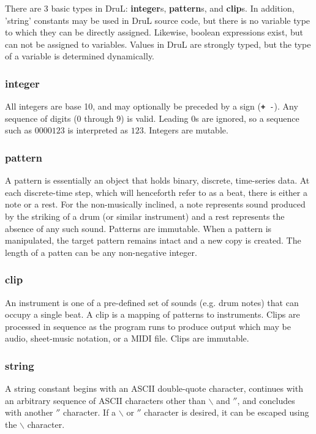 \documentclass[11pt,twoside]{article}
\begin{document}
There are $3$ basic types in DruL: \textbf{integer}s, \textbf{pattern}s,
and \textbf{clip}s.  In addition, 'string' constants may be used in DruL source code, but there is no variable type to which they can be directly assigned.
Likewise, boolean expressions exist, but can not be assigned to variables.
Values in DruL are strongly typed, but the type of a variable is determined dynamically.

\subsubsection{integer}
All integers are base 10, and may optionally be preceded by a sign ({\tt \textbf + -}).
Any sequence of digits ($0$ through $9$) is valid.  Leading $0$s are ignored, so a sequence such as $0000123$  is interpreted as $123$.  Integers are mutable.

\subsubsection{pattern}
A pattern is essentially an object that holds binary, discrete, time-series data.  At each discrete-time step, which will henceforth refer to as a beat, there is either a note or a rest.  For the non-musically inclined, a note represents sound produced by the striking of a drum (or similar instrument) and a rest represents the absence of any such sound.  Patterns are immutable.  When a pattern is manipulated, the target pattern remains intact and a new copy is created.  The length of a patten can be any non-negative integer.

\subsubsection{clip}

An instrument is one of a pre-defined set of sounds (e.g. drum notes) that can occupy a single beat.
A clip is a mapping of patterns to instruments. Clips are processed in sequence as the program runs to produce output which may be audio, sheet-music notation, or a MIDI file.  Clips are immutable.

\subsubsection{string}

A string constant begins with an ASCII double-quote character, continues 
with an arbitrary sequence of ASCII characters other than $\backslash$ and $''$, 
and concludes with another $''$ character.  If a $\backslash$ or $''$ character is 
desired, it can be escaped using the $\backslash$ character.
\end{document}
